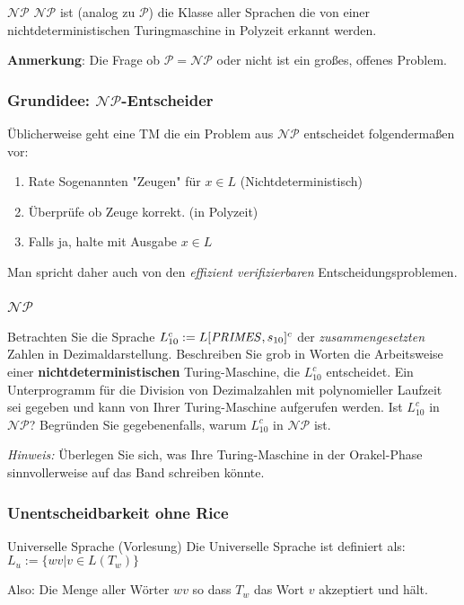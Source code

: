\documentclass{beamer}
\begin{document}
{\begin{frame}
\begin{block}{$\mathcal{NP}$}
$\mathcal{NP}$ ist (analog zu $\mathcal{P}$) die Klasse aller Sprachen die von einer nichtdeterministischen Turingmaschine in Polyzeit erkannt werden.
\end{block}\vspace{1cm}
\textbf{Anmerkung}: Die Frage ob $\mathcal{P} = \mathcal{NP}$ oder nicht ist ein großes, offenes Problem.
\end{frame}

\begin{frame}
\frametitle{Grundidee: $\mathcal{NP}$-Entscheider}
Üblicherweise geht eine TM die ein Problem aus $\mathcal{NP}$ entscheidet folgendermaßen vor: 
\begin{enumerate}
\item Rate Sogenannten "Zeugen" für $x \in L$ (Nichtdeterministisch)
\item Überprüfe ob Zeuge korrekt. (in Polyzeit)
\item Falls ja, halte mit Ausgabe $x \in L$
\end{enumerate}
Man spricht daher auch von den \emph{effizient verifizierbaren} Entscheidungsproblemen.
\end{frame}

\begin{frame}
\frametitle{$\mathcal{NP}$}
 Betrachten Sie die Sprache $L_{10}^c := L[\text{\textit{PRIMES}},s_{10}]^c$ der \textit{zusammengesetzten} Zahlen in Dezimaldarstellung. 
Beschreiben Sie grob in Worten die Arbeitsweise einer \textbf{nichtdeterministischen} Turing-Maschine, die $L_{10}^c$ entscheidet. 
Ein Unterprogramm für die Division von Dezimalzahlen mit polynomieller Laufzeit sei gegeben und kann von Ihrer Turing-Maschine aufgerufen werden. 
Ist $L_{10}^c$ in $\mathcal{NP}$? Begründen Sie gegebenenfalls, warum $L_{10}^c$ in $\mathcal{NP}$ ist.

\medskip
\textit{Hinweis:} Überlegen Sie sich, was Ihre Turing-Maschine in der Orakel-Phase sinnvollerweise auf das Band schreiben könnte.
\end{frame}


\begin{frame}
\frametitle{Unentscheidbarkeit ohne Rice}
\begin{block}{Universelle Sprache (Vorlesung)}
Die Universelle Sprache ist definiert als: $L_u := \{wv | v \in L(T_w)\}$
\end{block}
Also: Die Menge aller Wörter $wv$ so dass $T_w$ das Wort $v$ akzeptiert und hält.
\end{frame}

}
\end{document}
